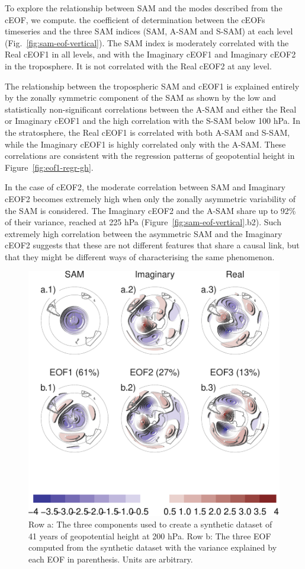 \documentclass[smallextended]{svjour3}       %
\begin{document}
To explore the relationship between SAM and the modes described from the cEOF, we compute. the coefficient of determination between the cEOFs timeseries and the three SAM indices (SAM, A-SAM and S-SAM) at each level (Fig.~\ref{fig:sam-eof-vertical}). The SAM index is moderately correlated with the Real cEOF1 in all levels, and with the Imaginary cEOF1 and Imaginary cEOF2 in the troposphere. It is not correlated with the Real cEOF2 at any level.

The relationship between the tropospheric SAM and cEOF1 is explained entirely by the zonally symmetric component of the SAM as shown by the low and statistically non-significant correlations between the A-SAM and either the Real or Imaginary cEOF1 and the high correlation with the S-SAM below 100 hPa. In the stratosphere, the Real cEOF1 is correlated with both A-SAM and S-SAM, while the Imaginary cEOF1 is highly correlated only with the A-SAM. These correlations are consistent with the regression patterns of geopotential height in Figure~\ref{fig:eof1-regr-gh}.

In the case of cEOF2, the moderate correlation between SAM and Imaginary cEOF2 becomes extremely high when only the zonally asymmetric variability of the SAM is considered. The Imaginary cEOF2 and the A-SAM share up to 92\% of their variance, reached at 225 hPa (Figure~\ref{fig:sam-eof-vertical}.b2). Such extremely high correlation between the asymmetric SAM and the Imaginary cEOF2 suggests that these are not different features that share a causal link, but that they might be different ways of characterising the same phenomenon.



\begin{figure}
\centering
\includegraphics{../figures/fake-eof-1.pdf}
\caption{\label{fig:fake-eof}Row a: The three components used to create a synthetic dataset of 41 years of geopotential height at 200 hPa. Row b: The three EOF computed from the synthetic dataset with the variance explained by each EOF in parenthesis. Units are arbitrary.}
\end{figure}
\end{document}
